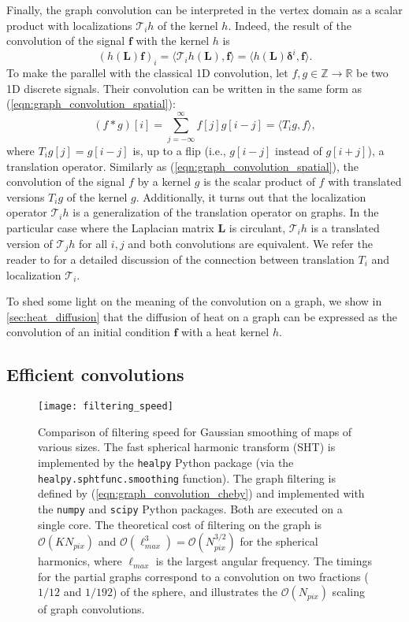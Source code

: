 \documentclass[final,twocolumn,3p,times,sort&compress]{elsarticle}
\newcommand{\eqnref}[1]{(\ref{eqn:#1})}
\renewcommand{\b}[1]{{\bm{#1}}}   %
\newcommand{\1}{\b{1}}              %
\newcommand{\0}{\b{0}}              %
\renewcommand{\L}{\b{L}}
\newcommand{\f}{\b{f}}
\newcommand{\bO}{\mathcal{O}}
\newcommand{\T}{\mathcal{T}}
\begin{document}
Finally, the graph convolution can be interpreted in the vertex domain as a scalar product with localizations $\T_i h$ of the kernel $h$. Indeed, the result of the convolution of the signal $\f$ with the kernel $h$ is
\begin{equation} \label{eqn:graph_convolution_spatial}
	(h(\L) \f)_i = \langle \T_i h(\L), \f \rangle = \langle h(\L) \b \delta^i, \f \rangle.
\end{equation}
To make the parallel with the classical 1D convolution, let $f, g\in \mathbb{Z} \rightarrow \mathbb{R}$ be two 1D discrete signals. Their convolution can be written in the same form as \eqnref{graph_convolution_spatial}:
\begin{equation*}
	(f \ast g) [i] = \sum_{j=-\infty}^\infty f[j] g[i-j] = \langle T_i g,  f \rangle,
\end{equation*}
where $T_i g[j] = g[i-j]$ is, up to a flip (i.e., $g[i-j]$ instead of $g[i+j]$), a translation operator.
Similarly as \eqnref{graph_convolution_spatial}, the convolution of the signal $f$ by a kernel $g$ is the scalar product of $f$ with translated versions $T_i g$ of the kernel $g$.
Additionally, it turns out that the localization operator $\T_i h$ is a generalization of the translation operator on graphs. In the particular case where the Laplacian matrix $\L$ is circulant, $\T_i h$ is a translated version of $\T_j h$ for all $i, j$ and both convolutions are equivalent. We refer the reader to \citep[Sec 2.2]{perraudin2017stationary} for a detailed discussion of the connection between translation $T_i$ and localization $\T_i$.

To shed some light on the meaning of the convolution on a graph, we show in \ref{sec:heat_diffusion} that the diffusion of heat on a graph can be expressed as the convolution of an initial condition $\f$ with a heat kernel $h$.

\subsection{Efficient convolutions}
\label{sec:efficient_convolution}

\begin{figure}[t!]
    \centering
    \texttt{[image: filtering\_speed]}
    \caption{Comparison of filtering speed for Gaussian smoothing of maps of various sizes.
    The fast spherical harmonic transform (SHT) is implemented by the \texttt{healpy} Python package (via the \texttt{healpy.sphtfunc.smoothing} function).
    The graph filtering is defined by \eqnref{graph_convolution_cheby} and implemented with the \texttt{numpy} and \texttt{scipy} Python packages.
    Both are executed on a single core.
	The theoretical cost of filtering on the graph is $\bO(K N_{pix})$ and $\bO(\ell_{max}^3) = \bO(N_{pix}^{3/2})$ for the spherical harmonics, where $\ell_{max}$ is the largest angular frequency.
	The timings for the partial graphs correspond to a convolution on two fractions ($1/12$ and $1/192$) of the sphere, and illustrates the $\bO(N_{pix})$ scaling of graph convolutions.
	}
    \label{fig:filtering_speed}
\end{figure}
\end{document}
